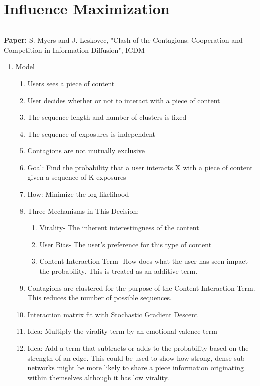 \documentclass[11pt]{article}
\begin{document}
\begin{enumerate}
\end{enumerate}
\smallskip
\section{Influence Maximization}
\noindent
\rule{\textwidth}{0.01in}
\textbf{Paper:} S. Myers and J. Leskovec, "Clash of the Contagions: Cooperation and Competition in Information Diffusion", ICDM
\begin{enumerate}
    \item Model 
    \begin{enumerate}
        \item Users sees a piece of content
        \item User decides whether or not to interact with a piece of content
        \item The sequence length and number of clusters is fixed
        \item The sequence of exposures is independent
        \item Contagions are not mutually exclusive
        \item Goal: Find the probability that a user interacts X with a piece of content given a sequence of K exposures
         \item How: Minimize the log-likelihood
        \item Three Mechanisms in This Decision: 
        \begin{enumerate}
            \item Virality- The inherent interestingness of the content
            \item User Bias- The user's preference for this type of content
            \item Content Interaction Term- How does what the user has seen impact the probability. This is treated as an additive term.
        \end{enumerate}
        \item Contagions are clustered for the purpose of the Content Interaction Term. This reduces the number of possible sequences.
        \item Interaction matrix fit with Stochastic Gradient Descent
        \item Idea: Multiply the virality term by an emotional valence term 
        \item Idea: Add a term that subtracts or adds to the probability based on the strength of an edge. This could be used to show how strong, dense sub-networks might be more likely to share a piece information originating within themselves although it has low virality.

\end{enumerate}
\end{enumerate}
\end{document}
